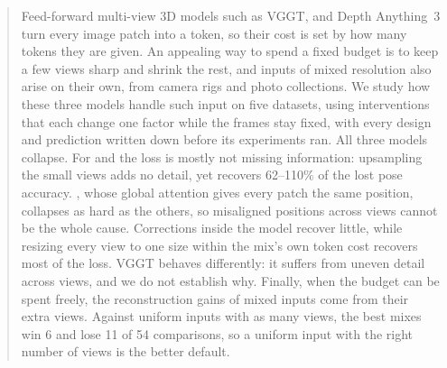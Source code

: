 \begin{abstract}
Feed-forward multi-view 3D models such as VGGT, \pithree and Depth Anything~3 turn every image patch into a token, so their cost is set by how many tokens they are given. An appealing way to spend a fixed budget is to keep a few views sharp and shrink the rest, and inputs of mixed resolution also arise on their own, from camera rigs and photo collections. We study how these three models handle such input on five datasets, using interventions that each change one factor while the frames stay fixed, with every design and prediction written down before its experiments ran. All three models collapse. For \pithree and \dathree the loss is mostly not missing information: upsampling the small views adds no detail, yet recovers 62--110\% of the lost pose accuracy. \dathree, whose global attention gives every patch the same position, collapses as hard as the others, so misaligned positions across views cannot be the whole cause. Corrections inside the model recover little, while resizing every view to one size within the mix's own token cost recovers most of the loss. VGGT behaves differently: it suffers from uneven detail across views, and we do not establish why. Finally, when the budget can be spent freely, the reconstruction gains of mixed inputs come from their extra views. Against uniform inputs with as many views, the best mixes win 6 and lose 11 of 54 comparisons, so a uniform input with the right number of views is the better default.
\end{abstract}
